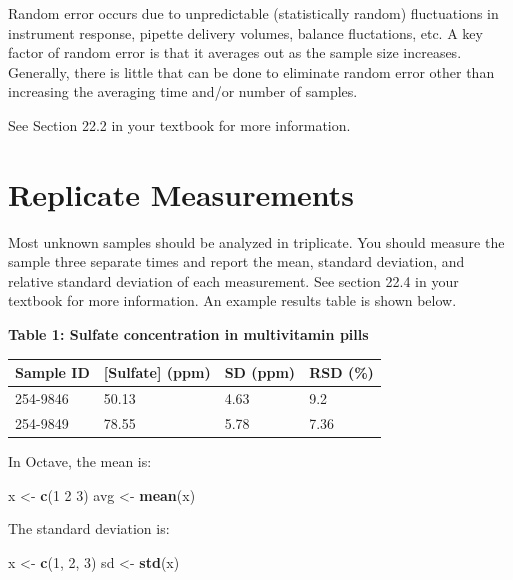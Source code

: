 \documentclass[]{tufte-book}
\newenvironment{Shaded}{}{}
\newcommand{\DecValTok}[1]{\textcolor[rgb]{0.25,0.63,0.44}{#1}}
\newcommand{\KeywordTok}[1]{\textcolor[rgb]{0.00,0.44,0.13}{\textbf{#1}}}
\newcommand{\NormalTok}[1]{#1}
\newcommand{\StringTok}[1]{\textcolor[rgb]{0.25,0.44,0.63}{#1}}
\begin{document}
Random error occurs due to unpredictable (statistically random) fluctuations in instrument response, pipette delivery volumes, balance fluctations, etc. A key factor of random error is that it averages out as the sample size increases. Generally, there is little that can be done to eliminate random error other than increasing the averaging time and/or number of samples.

See Section 22.2 in your textbook for more information.

\hypertarget{replicate-measurements}{%
\section*{Replicate Measurements}\label{replicate-measurements}}

Most unknown samples should be analyzed in triplicate. You should measure the sample three separate times and report the mean, standard deviation, and relative standard deviation of each measurement. See section 22.4 in your textbook for more information. An example results table is shown below.

\textbf{Table 1: Sulfate concentration in multivitamin pills}

\begin{longtable}[]{@{}llll@{}}
\toprule
Sample ID & {[}Sulfate{]} (ppm) & SD (ppm) & RSD (\%)\tabularnewline
\midrule
\endhead
254-9846 & 50.13 & 4.63 & 9.2\tabularnewline
254-9849 & 78.55 & 5.78 & 7.36\tabularnewline
\bottomrule
\end{longtable}

In Octave, the mean is:

\begin{Shaded}
\begin{Highlighting}[]
\NormalTok{x <-}\StringTok{ }\KeywordTok{c}\NormalTok{(}\DecValTok{1} \DecValTok{2} \DecValTok{3}\NormalTok{)}
\NormalTok{avg <-}\StringTok{ }\KeywordTok{mean}\NormalTok{(x)}
\end{Highlighting}
\end{Shaded}

The standard deviation is:

\begin{Shaded}
\begin{Highlighting}[]
\NormalTok{x <-}\StringTok{ }\KeywordTok{c}\NormalTok{(}\DecValTok{1}\NormalTok{, }\DecValTok{2}\NormalTok{, }\DecValTok{3}\NormalTok{)}
\NormalTok{sd <-}\StringTok{ }\KeywordTok{std}\NormalTok{(x)}
\end{Highlighting}
\end{Shaded}
\end{document}
